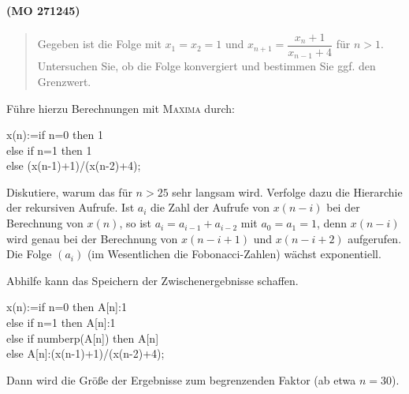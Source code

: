 \documentclass[11pt,a4paper]{article}
\newcommand{\cas}[1]{\textsc{#1}}
\begin{document}
\paragraph{(MO 271245)}
\begin{quote}
  Gegeben ist die Folge mit $x_1=x_2=1$ und $x_{n+1}=\dfrac{x_n+1}{x_{n-1}+4}$
  für $n>1$.  Untersuchen Sie, ob die Folge konvergiert und bestimmen Sie ggf.
  den Grenzwert.
\end{quote}
Führe hierzu Berechnungen mit \cas{Maxima} durch:
\begin{code}
  x(n):=if n=0 then 1\\
  else if n=1 then 1\\
  else (x(n-1)+1)/(x(n-2)+4);
\end{code}
Diskutiere, warum das für $n>25$ sehr langsam wird.  Verfolge dazu die
Hierarchie der rekursiven Aufrufe.  Ist $a_i$ die Zahl der Aufrufe von
$x(n-i)$ bei der Berechnung von $x(n)$, so ist $a_i=a_{i-1}+a_{i-2}$ mit
$a_0=a_1=1$, denn $x(n-i)$ wird genau bei der Berechnung von $x(n-i+1)$ und
$x(n-i+2)$ aufgerufen.  Die Folge $(a_i)$ (im Wesentlichen die
Fobonacci-Zahlen) wächst exponentiell.

Abhilfe kann das Speichern der Zwischenergebnisse schaffen. 
\begin{code}
  x(n):=if n=0 then A[n]:1\\
  else if n=1 then A[n]:1\\
  else if numberp(A[n]) then A[n]\\
  else A[n]:(x(n-1)+1)/(x(n-2)+4);
\end{code}
Dann wird die Größe der Ergebnisse zum begrenzenden Faktor (ab etwa $n=30$). 
\end{document}
